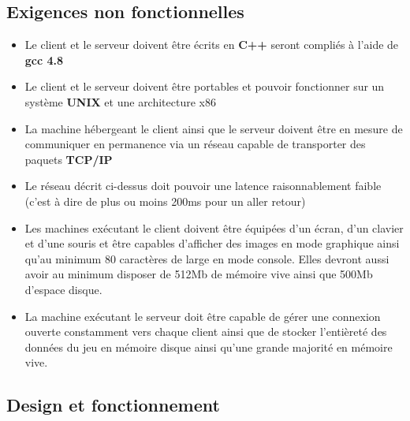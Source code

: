 \documentclass[a4paper]{article}
\begin{document}
\subsection{Exigences non fonctionnelles}
\label{enf}
\begin{itemize}
\item Le \gls{client} et le \gls{serveur} doivent être écrits en \textbf{C++} seront compliés à l'aide de \textbf{gcc 4.8}
\item Le \gls{client} et le \gls{serveur} doivent être portables et pouvoir fonctionner sur un système \textbf{UNIX} et une architecture x86
\item La machine hébergeant le \gls{client} ainsi que le \gls{serveur} doivent être en mesure de communiquer en permanence via un réseau capable de transporter des paquets \textbf{TCP/IP}
\item Le réseau décrit ci-dessus doit pouvoir une latence raisonnablement faible (c'est à dire de plus ou moins 200ms pour un aller retour)
\item Les machines exécutant le \gls{client} doivent être équipées d'un écran, d'un clavier et d'une souris et être capables d'afficher des images en mode graphique ainsi qu'au minimum 80 caractères de large en mode console. Elles devront aussi avoir au minimum disposer de 512Mb de mémoire vive ainsi que 500Mb d'espace disque.
\item La machine exécutant le \gls{serveur} doit être capable de gérer une connexion ouverte constamment vers chaque \gls{client} ainsi que de stocker l'entièreté des données du jeu en mémoire disque ainsi qu'une grande majorité en mémoire vive.
\end{itemize}

\subsection{Design et fonctionnement}

\printindex
\tableofcontents
\listoffigures
\end{document}
